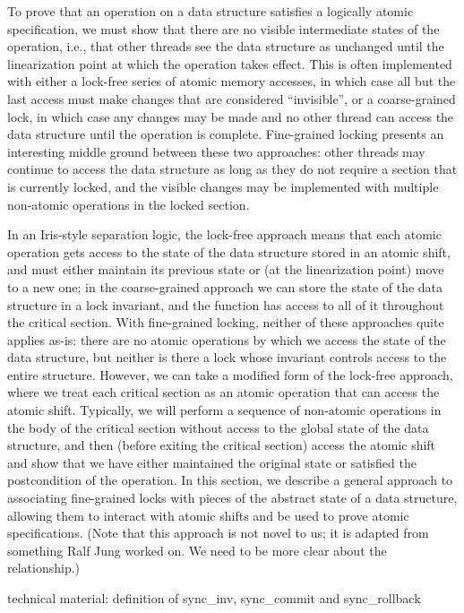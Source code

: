 \documentclass[acmsmall,screen]{acmart}\settopmatter{printfolios=true}
\begin{document}
To prove that an operation on a data structure satisfies a logically atomic specification, we must show that there are no visible intermediate states of the operation, i.e., that other threads see the data structure as unchanged until the linearization point at which the operation takes effect. This is often implemented with either a lock-free series of atomic memory accesses, in which case all but the last access must make changes that are considered ``invisible'', or a coarse-grained lock, in which case any changes may be made and no other thread can access the data structure until the operation is complete. Fine-grained locking presents an interesting middle ground between these two approaches: other threads may continue to access the data structure as long as they do not require a section that is currently locked, and the visible changes may be implemented with multiple non-atomic operations in the locked section.

In an Iris-style separation logic, the lock-free approach means that each atomic operation gets access to the state of the data structure stored in an atomic shift, and must either maintain its previous state or (at the linearization point) move to a new one; in the coarse-grained approach we can store the state of the data structure in a lock invariant, and the function has access to all of it throughout the critical section. With fine-grained locking, neither of these approaches quite applies as-is: there are no atomic operations by which we access the state of the data structure, but neither is there a lock whose invariant controls access to the entire structure. However, we can take a modified form of the lock-free approach, where we treat each critical section as an atomic operation that can access the atomic shift. Typically, we will perform a sequence of non-atomic operations in the body of the critical section without access to the global state of the data structure, and then (before exiting the critical section) access the atomic shift and show that we have either maintained the original state or satisfied the postcondition of the operation. In this section, we describe a general approach to associating fine-grained locks with pieces of the abstract state of a data structure, allowing them to interact with atomic shifts and be used to prove atomic specifications. (Note that this approach is not novel to us; it is adapted from something Ralf Jung worked on. We need to be more clear about the relationship.)

technical material: definition of sync\_inv, sync\_commit and sync\_rollback
\end{document}
